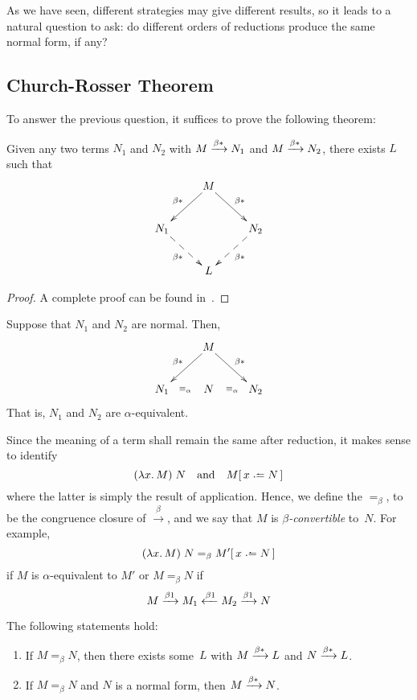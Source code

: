 As we have seen, different strategies may give different results, so it leads to
a natural question to ask: do different orders of reductions produce the same
normal form, if any? 

\subsection{Church-Rosser Theorem}
To answer the previous question, it suffices to prove the following theorem:
\begin{theorem}
  Given any two terms $N_1$ and $N_2$ with $M \xrightarrow{\beta*} N_1$ and $M\xrightarrow{\beta*} N_2$,
  there exists $L$ such that
  \[
    \xymatrix{
      & M \ar[rd]^{\beta*} \ar[ld]_{\beta*} \\
      N_1 \ar@{-->}[rd]_{\beta*} & & N_2 \ar@{-->}[ld]^{\beta*} \\
      & L
    }
  \]
\end{theorem}
\begin{proof}
  A complete proof can be found in~\cite[Chapter 4]{Barendregt1984}.
\end{proof}
\begin{corollary}\label{coro:uniqueness-normal}
  Suppose that $N_1$ and $N_2$ are normal. Then, 
  \[
    \xymatrix{
      & M \ar[rd]^{\beta*} \ar[ld]_{\beta*} \\
      N_1 \ar@{}[r]|{\equiv_\alpha} & N & N_2 \ar@{}[l]|{\equiv_\alpha} \\
    }
  \]
  That is, $N_1$ and $N_2$ are $\alpha$-equivalent.
\end{corollary}

Since the meaning of a term shall remain the same after reduction, it makes
sense to identify 
\[
  (\lambda x.\, M)\;N
  \quad\text{and}\quad
  M\subst{x}{N}
\]
where the latter is simply the result of application. Hence, we define the
$=_\beta$, to be the congruence closure of $\xrightarrow{\beta}$, and we say
that $M$ is \emph{$\beta$-convertible} to~$N$. For example, 
\[
  (\lambda x.\, M)\;N
  =_\beta
  M'\subst{x}{N}
\]
if $M$ is $\alpha$-equivalent to $M'$ or
$M =_\beta N$ if
\[
  M \xrightarrow{\beta1} M_1 \xleftarrow{\beta1} M_2 \xrightarrow{\beta1} N
\]
\begin{corollary} \label{coro:logical-theory}
  The following statements hold:
  \begin{enumerate}
    \item If $M =_\beta N$, then there exists some~$L$ with $M \xrightarrow{\beta*} L$ and $N
      \xrightarrow{\beta*} L$.
    \item If $M =_\beta N$ and $N$ is a normal form, then 
      $M \xrightarrow{\beta*} N$.
  \end{enumerate}
\end{corollary}
